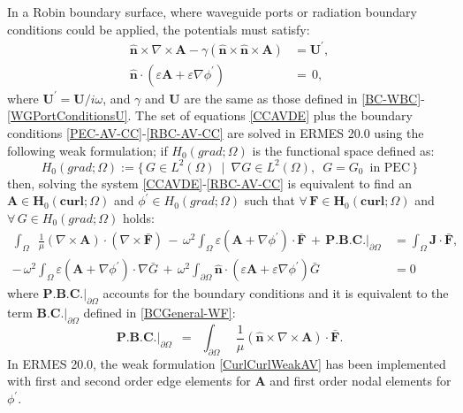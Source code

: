 In a Robin boundary surface, where waveguide ports or radiation boundary conditions could be applied, the potentials must satisfy:
\begin{equation}\label{RBC-AV-CC}
	\begin{aligned}
		\mathbf{\hat{n}}\times\nabla\times\mathbf{A} - \gamma(\mathbf{\hat{n}}\times\mathbf{\hat{n}}\times\mathbf{A}) &= \mathbf{U}^{'},
		\\
		\mathbf{\hat{n}}\cdot\left(\varepsilon\mathbf{A} + \varepsilon\nabla\phi^{'}\right) &= \,0,
	\end{aligned}
\end{equation}
where $\mathbf{U}^{'} = \mathbf{U}/i\omega$, and $\gamma$ and $\mathbf{U}$ are the same as those defined in \ref{BC-WBC}-\ref{WGPortConditionsU}. The set of equations \ref{CCAVDE} plus the boundary conditions \ref{PEC-AV-CC}-\ref{RBC-AV-CC} are solved in ERMES 20.0 using the following weak formulation; if $H_{0}(grad;\Omega)$ is the functional space defined as:
\begin{equation}\label{HGrad}
	H_{0}(grad;\Omega) := \{\,G\in L^{2}(\Omega)\enspace|\enspace\nabla G \in L^{2}(\Omega),\enspace G = G_{0}\enspace\text{in PEC}\,\}
\end{equation}
then, solving the system \ref{CCAVDE}-\ref{RBC-AV-CC} is equivalent to find an $\mathbf{A} \in \mathbf{H}_{0}(\mathbf{curl};\Omega)$ and $\phi^{'} \in H_{0}(grad;\Omega)$ such
that $\forall\,\mathbf{F} \in \mathbf{H}_{0}(\mathbf{curl};\Omega)$ and $\forall\,G \in H_{0}(grad;\Omega)$ holds:
\begin{equation}\label{CurlCurlWeakAV}
    \begin{aligned}
	\int_{\Omega}\enspace\frac{1}{\mu}(\nabla\times\mathbf{A})\cdot(\nabla\times\mathbf{\bar{F}})\, - \,\omega^{2}\int_{\Omega}\varepsilon\left(\mathbf{A} + \nabla\phi^{'}\right)\cdot\mathbf{\bar{F}}\, + \,\textbf{P.B.C.}|_{\partial\Omega}\, &= \int_{\Omega}\mathbf{J}\cdot\mathbf{\bar{F}},
	\\
	-\,\omega^{2}\int_{\Omega}\varepsilon\left(\mathbf{A} + \nabla\phi^{'}\right)\cdot\nabla\bar{G}\, + \,\omega^{2}\int_{\partial\Omega}\mathbf{\hat{n}}\cdot\left(\varepsilon\mathbf{A} + \varepsilon\nabla\phi^{'}\right)\bar{G}\, &= 0	
    \end{aligned}
\end{equation}
where $\textbf{P.B.C.}|_{\partial\Omega}$ accounts for the boundary conditions and it is equivalent to the term $\textbf{B.C.}|_{\partial\Omega}$ defined in \ref{BCGeneral-WF}:
\begin{equation}\label{BCGeneral-CCAV}
	\textbf{P.B.C.}|_{\partial\Omega}\enspace = \enspace\int_{\partial\Omega}\enspace\frac{1}{\mu}\left(\mathbf{\hat{n}}\times\nabla\times\mathbf{A}\right)\cdot\mathbf{\bar{F}}.
\end{equation}
In ERMES 20.0, the weak formulation \ref{CurlCurlWeakAV} has been implemented with first and second order edge elements for \textbf{A} and first order nodal elements for $\phi^{'}$. 

